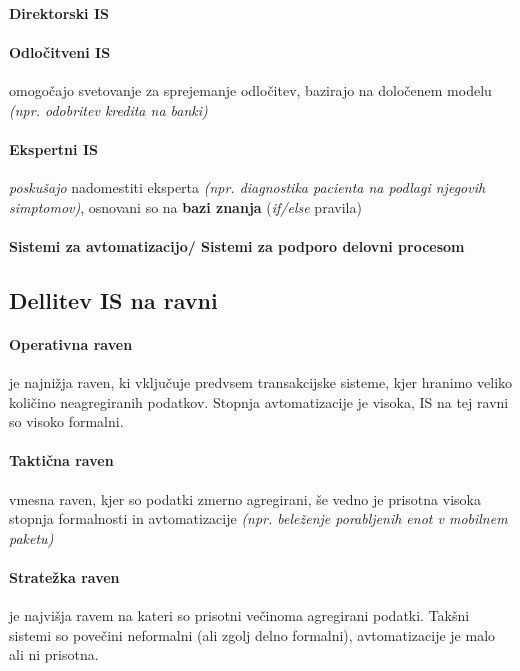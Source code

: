 \documentclass[a4paper,12pt]{report}
\begin{document}
   \paragraph{Direktorski IS}\mbox{}

   \paragraph{Odločitveni IS} omogočajo svetovanje za sprejemanje odločitev, bazirajo na določenem modelu \textit{(npr. odobritev kredita na banki)}

   \paragraph{Ekspertni IS} \textit{poskušajo} nadomestiti eksperta \textit{(npr. diagnostika pacienta na podlagi njegovih simptomov)}, osnovani so na \textbf{bazi znanja} (\textit{if/else} pravila)

   \paragraph{Sistemi za avtomatizacijo/ Sistemi za podporo delovni procesom}\mbox{}

   \subsection{Dellitev IS na ravni}
      \paragraph{Operativna raven} je najnižja raven, ki vključuje predvsem transakcijske sisteme, kjer hranimo veliko količino neagregiranih podatkov.
      Stopnja avtomatizacije je visoka, IS na tej ravni so visoko formalni.
      \paragraph{Taktična raven} vmesna raven, kjer so podatki zmerno agregirani, še vedno je prisotna visoka stopnja formalnosti in avtomatizacije \textit{(npr. beleženje porabljenih enot v mobilnem paketu)}
      \paragraph{Stratežka raven} je najvišja ravem na kateri so prisotni večinoma agregirani podatki. Takšni sistemi so povečini neformalni (ali zgolj delno formalni), avtomatizacije je malo ali ni prisotna.
\end{document}

